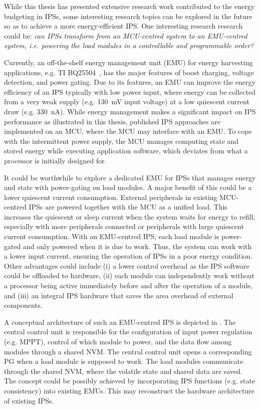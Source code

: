 While this thesis has presented extensive research work contributed to the energy budgeting in IPSs, some interesting research topics can be explored in the future so as to achieve a more energy-efficient IPS. 
One interesting research research could be: \textit{can IPSs transform from an MCU-centred system to an EMU-centred system, i.e. powering the load modules in a controllable and programmable order?} 

Currently, an off-the-shelf energy management unit (EMU) for energy harvesting applications, e.g. TI BQ25504~\cite{bq25504}, has the major features of boost charging, voltage detection, and power gating.
Due to its features, an EMU can improve the energy efficiency of an IPS typically with low power input, where energy can be collected from a very weak supply (e.g. \SI{130}{\milli\volt} input voltage) at a low quiescent current draw (e.g. \SI{330}{\nano\ampere}). 
While energy management makes a significant impact on IPS performance as illustrated in this thesis, published IPS approaches are implemented on an MCU, where the MCU may interface with an EMU.
To cope with the intermittent power supply, the MCU manages computing state and stored energy while executing application software, which deviates from what a processor is initially designed for. 

It could be worthwhile to explore a dedicated EMU for IPSs that manages energy and state with power-gating on load modules.
A major benefit of this could be a lower quiescent current consumption. %
External peripherals in existing MCU-centred IPSs are powered together with the MCU as a unified load.
This increases the quiescent or sleep current when the system waits for energy to refill, especially with more peripherals connected or peripherals with large quiescent current consumption. 
With an EMU-centred IPS, each load module is power-gated and only powered when it is due to work. 
Thus, the system can work with a lower input current, ensuring the operation of IPSs in a poor energy condition. 
Other advantages could include (i) a lower control overhead as the IPS software could be offloaded to hardware, (ii) each module can independently work without a processor being active immediately before and after the operation of a module, and (iii) an integral IPS hardware that saves the area overhead of external components. 

A conceptual architecture of such an EMU-centred IPS is depicted in .
The central control unit is responsible for the configuration of input power regulation (e.g. MPPT), control of which module to power, and the data flow among modules through a shared NVM. 
The central control unit opens a corresponding PG when a load module is supposed to work.
The load modules communicate through the shared NVM, where the volatile state and shared data are saved. 
The concept could be possibly achieved by incorporating IPS functions (e.g. state consistency) into existing EMUs.
This may reconstruct the hardware architecture of existing IPSs.


